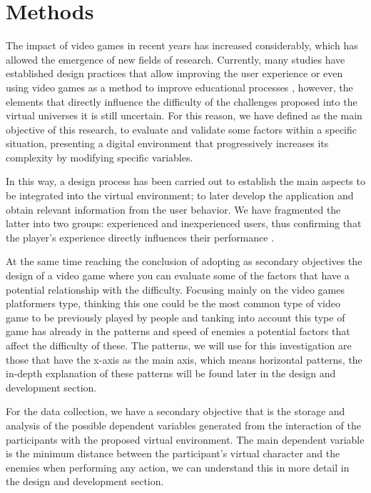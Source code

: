 
\chapter{Methods}

The impact of video games in recent years has increased considerably, which has allowed the emergence of new fields of research. Currently, many studies have established design practices that allow improving the user experience or even using video games as a method to improve educational processes \cite{EducationLogan2019}, however, the elements that directly influence the difficulty of the challenges proposed into the virtual universes it is still uncertain. For this reason, we have defined as the main objective of this research, to evaluate and validate some factors within a specific situation, presenting a digital environment that progressively increases its complexity by modifying specific variables.

In this way, a design process has been carried out to establish the main aspects to be integrated into the virtual environment; to later develop the application and obtain relevant information from the user behavior. We have fragmented the latter into two groups: experienced and inexperienced users, thus confirming that the player's experience directly influences their performance \cite{Effect2014Baldwin}.

At the same time reaching the conclusion of adopting as secondary objectives the design of a video game where you can evaluate some of the factors that have a potential relationship with the difficulty. Focusing mainly on the video games platformers type, thinking this one could be the most common type of video game to be previously played by people and tanking into account this type of game has already in the patterns and speed of enemies a potential factors that affect the difficulty of these. The patterns, we will use for this investigation are those that have the x-axis as the main axis, which means horizontal patterns, the in-depth explanation of these patterns will be found later in the design and development section.

For the data collection, we have a secondary objective that is the storage and analysis of the possible dependent variables generated from the interaction of the participants with the proposed virtual environment. The main dependent variable is the minimum distance between the participant's virtual character and the enemies when performing any action, we can understand this in more detail in the design and development section.

